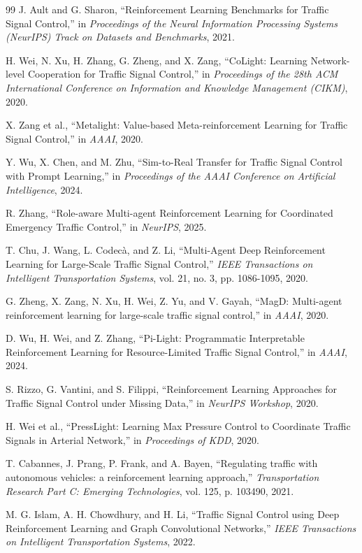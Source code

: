 \documentclass[12pt, a4paper]{report}
\begin{document}
\begin{thebibliography}{99}
 J. Ault and G. Sharon, ``Reinforcement Learning Benchmarks for Traffic Signal Control,'' in \textit{Proceedings of the Neural Information Processing Systems (NeurIPS) Track on Datasets and Benchmarks}, 2021.

 H. Wei, N. Xu, H. Zhang, G. Zheng, and X. Zang, ``CoLight: Learning Network-level Cooperation for Traffic Signal Control,'' in \textit{Proceedings of the 28th ACM International Conference on Information and Knowledge Management (CIKM)}, 2020.

 X. Zang et al., ``Metalight: Value-based Meta-reinforcement Learning for Traffic Signal Control,'' in \textit{AAAI}, 2020.

 Y. Wu, X. Chen, and M. Zhu, ``Sim-to-Real Transfer for Traffic Signal Control with Prompt Learning,'' in \textit{Proceedings of the AAAI Conference on Artificial Intelligence}, 2024.

 R. Zhang, ``Role-aware Multi-agent Reinforcement Learning for Coordinated Emergency Traffic Control,'' in \textit{NeurIPS}, 2025.

 T. Chu, J. Wang, L. Codecà, and Z. Li, ``Multi-Agent Deep Reinforcement Learning for Large-Scale Traffic Signal Control,'' \textit{IEEE Transactions on Intelligent Transportation Systems}, vol. 21, no. 3, pp. 1086-1095, 2020.

 G. Zheng, X. Zang, N. Xu, H. Wei, Z. Yu, and V. Gayah, ``MagD: Multi-agent reinforcement learning for large-scale traffic signal control,'' in \textit{AAAI}, 2020.

 D. Wu, H. Wei, and Z. Zhang, ``Pi-Light: Programmatic Interpretable Reinforcement Learning for Resource-Limited Traffic Signal Control,'' in \textit{AAAI}, 2024.

 S. Rizzo, G. Vantini, and S. Filippi, ``Reinforcement Learning Approaches for Traffic Signal Control under Missing Data,'' in \textit{NeurIPS Workshop}, 2020.

 H. Wei et al., ``PressLight: Learning Max Pressure Control to Coordinate Traffic Signals in Arterial Network,'' in \textit{Proceedings of KDD}, 2020.

 T. Cabannes, J. Prang, P. Frank, and A. Bayen, ``Regulating traffic with autonomous vehicles: a reinforcement learning approach,'' \textit{Transportation Research Part C: Emerging Technologies}, vol. 125, p. 103490, 2021.

 M. G. Islam, A. H. Chowdhury, and H. Li, ``Traffic Signal Control using Deep Reinforcement Learning and Graph Convolutional Networks,'' \textit{IEEE Transactions on Intelligent Transportation Systems}, 2022.


\end{thebibliography}
\end{document}
